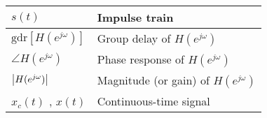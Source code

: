\begin{xltabular}{\textwidth}{XX}
	\(s(t)\)                                                                                              & Impulse train                                                                                                                                                                                                                                                                                                                                                                                                                                            \\ \hline
	\(\textrm{gdr}\left[ H (e^{j\omega}) \right]\) \cite{oppenheimDiscreteTimeSignalProcessing2009}       & Group delay of \(H (e^{j\omega})\)                                                                                                                                                                                                                                                                                                                                                                                                                       \\ \hline
	\(\angle H (e^{j\omega})\) \cite{oppenheimDiscreteTimeSignalProcessing2009}                           & Phase response of \(H (e^{j\omega})\)                                                                                                                                                                                                                                                                                                                                                                                                                    \\ \hline
	\(\abs{H (e^{j\omega})}\) \cite{oppenheimDiscreteTimeSignalProcessing2009}                            & Magnitude (or gain) of \(H (e^{j\omega})\)                                                                                                                                                                                                                                                                                                                                                                                                               \\ \hline
	\(x_c(t)\) \cite{oppenheimDiscreteTimeSignalProcessing2009}, \(x(t)\)                                 & Continuous-time signal                                                                                                                                                                                                                                                                                                                                                                                                                                   \\ \hline

\end{xltabular}
